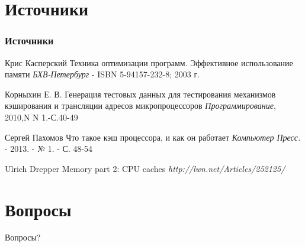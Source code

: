 \documentclass{beamer}
\begin{document}
\section{Источники}

\begin{frame}
\frametitle{Источники}
\footnotesize{
\begin{thebibliography}{99} %
 Крис Касперский
\newblock Техника оптимизации программ. Эффективное использование памяти
\newblock \emph{БХВ-Петербург} - ISBN 5-94157-232-8; 2003 г.
\end{thebibliography}

\begin{thebibliography}{98}
 Корныхин Е. В.
\newblock Генерация тестовых данных для тестирования механизмов кэширования и трансляции адресов микропроцессоров
\newblock \emph{Программирование}, 2010,N N 1.-С.40-49
\end{thebibliography}

\begin{thebibliography}{97}
 Сергей Пахомов
\newblock Что такое кэш процессора, и как он работает
\newblock \emph{Компьютер Пресс.} - 2013. - № 1. - С. 48-54
\end{thebibliography}

\begin{thebibliography}{96}
 Ulrich Drepper
\newblock Memory part 2: CPU caches
\newblock \emph{http://lwn.net/Articles/252125/}
\end{thebibliography}
}
\end{frame}

\section{Вопросы}

\begin{frame}
\Huge{\centerline{Вопросы?}}
\end{frame}

\end{document}

